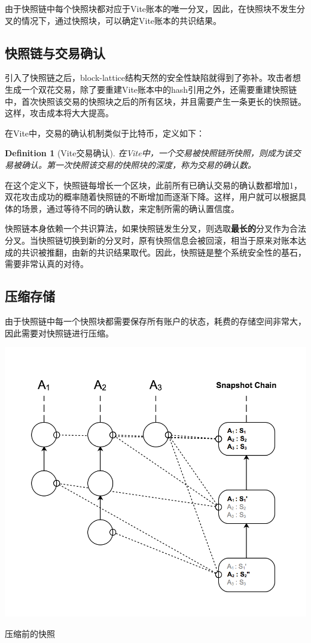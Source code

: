 \documentclass[UTF8,nofonts]{ctexart}
\makeatletter
\newtheorem{definition}{Definition}[section]
\newenvironment{figurehere}
 {\def\@captype{figure}}
 {}
\makeatother
\begin{document}
\begin{multicols}{2}
由于快照链中每个快照块都对应于Vite账本的唯一分叉，因此，在快照块不发生分叉的情况下，通过快照块，可以确定Vite账本的共识结果。

\subsection{快照链与交易确认}

引入了快照链之后，block-lattice结构天然的安全性缺陷就得到了弥补。攻击者想生成一个双花交易，除了要重建Vite账本中的hash引用之外，还需要重建快照链中，首次快照该交易的快照块之后的所有区块，并且需要产生一条更长的快照链。这样，攻击成本将大大提高。

在Vite中，交易的确认机制类似于比特币，定义如下：

\begin{definition}[Vite交易确认]
在Vite中，一个交易被快照链所快照，则成为该交易被确认。第一次快照该交易的快照块的深度，称为交易的确认数。
\end{definition}

在这个定义下，快照链每增长一个区块，此前所有已确认交易的确认数都增加1，双花攻击成功的概率随着快照链的不断增加而逐渐下降。这样，用户就可以根据具体的场景，通过等待不同的确认数，来定制所需的确认置信度。

快照链本身依赖一个共识算法，如果快照链发生分叉，则选取\textbf{最长的}分叉作为合法分叉。当快照链切换到新的分叉时，原有快照信息会被回滚，相当于原来对账本达成的共识被推翻，由新的共识结果取代。因此，快照链是整个系统安全性的基石，需要非常认真的对待。

\subsection{压缩存储}
由于快照链中每一个快照块都需要保存所有账户的状态，耗费的存储空间非常大，因此需要对快照链进行压缩。

\begin{center}
\begin{figurehere}
\includegraphics[width=.7\linewidth]{image/compact-snapshot.png}
\caption{压缩前的快照}
\end{figurehere}
\end{center}


\end{multicols}
\end{document}
